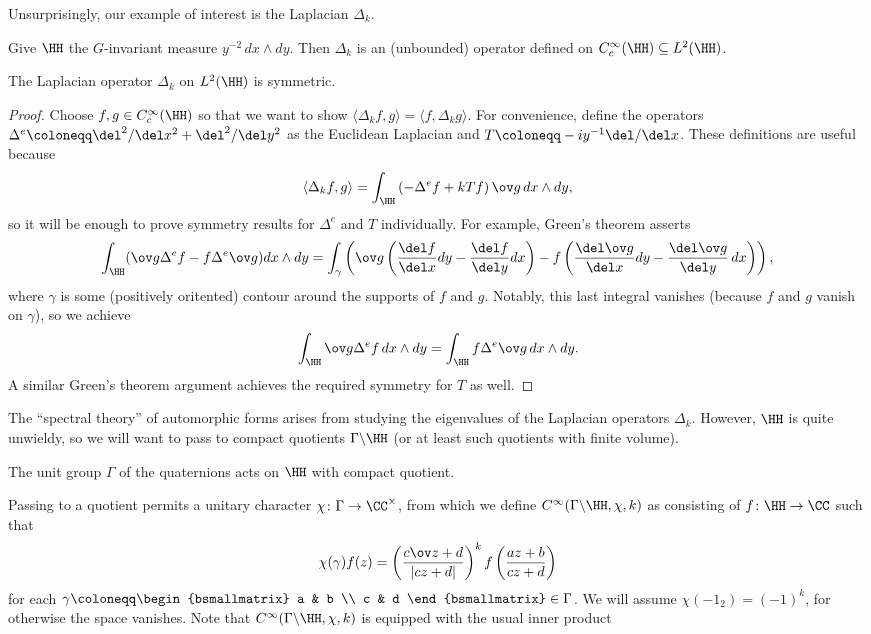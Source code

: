 \documentclass{article}
\begin{document}
Unsurprisingly, our example of interest is the Laplacian $\Delta_k$.
\begin{example}
	Give $\HH$ the $G$-invariant measure $y^{-2}\,dx\land dy$. Then $\Delta_k$ is an (unbounded) operator defined on $C_c^\infty(\HH)\subseteq L^2(\HH)$.
\end{example}
\begin{proposition}
	The Laplacian operator $\Delta_k$ on $L^2(\HH)$ is symmetric.
\end{proposition}
\begin{proof}
	Choose $f,g\in C_c^\infty(\HH)$ so that we want to show $\langle\Delta_kf,g\rangle=\langle f,\Delta_kg\rangle$. For convenience, define the operators $\Delta^e\coloneqq\del^2/\del x^2+\del^2/\del y^2$ as the Euclidean Laplacian and $T\coloneqq -iy^{-1}\del/\del x$. These definitions are useful because
	\[\langle\Delta_kf,g\rangle=\int_\HH\left(-\Delta^ef+kTf\right)\ov g\,dx\land dy,\]
	so it will be enough to prove symmetry results for $\Delta^e$ and $T$ individually. For example, Green's theorem asserts
	\[\int_\HH(\ov g\Delta^ef-f\Delta^e\ov g)dx\land dy=\int_\gamma\left(\ov g\left(\frac{\del f}{\del x}dy-\frac{\del f}{\del y}dx\right)-f\left(\frac{\del\ov g}{\del x}dy-\frac{\del\ov g}{\del y}\,dx\right)\right),\]
	where $\gamma$ is some (positively oritented) contour around the supports of $f$ and $g$. Notably, this last integral vanishes (because $f$ and $g$ vanish on $\gamma$), so we achieve
	\[\int_\HH\ov g\Delta^ef\,dx\land dy=\int_\HH f\Delta^e\ov g\,dx\land dy.\]
	A similar Green's theorem argument achieves the required symmetry for $T$ as well.
\end{proof}
The ``spectral theory'' of automorphic forms arises from studying the eigenvalues of the Laplacian operators $\Delta_k$. However, $\HH$ is quite unwieldy, so we will want to pass to compact quotients $\Gamma\backslash\HH$ (or at least such quotients with finite volume).
\begin{example}
	The unit group $\Gamma$ of the quaternions acts on $\HH$ with compact quotient.
\end{example}
Passing to a quotient permits a unitary character $\chi\colon\Gamma\to\CC^\times$, from which we define $C^\infty(\Gamma\backslash\HH,\chi,k)$ as consisting of $f\colon\HH\to\CC$ such that
\[\chi(\gamma)f(z)=\left(\frac{c\ov z+d}{\left|cz+d\right|}\right)^kf\left(\frac{az+b}{cz+d}\right)\]
for each $\gamma\coloneqq\begin{bsmallmatrix}
	a & b \\ c & d
\end{bsmallmatrix}\in\Gamma$. We will assume $\chi(-1_2)=(-1)^k$, for otherwise the space vanishes. Note that $C^\infty(\Gamma\backslash\HH,\chi,k)$ is equipped with the usual inner product
\end{document}
